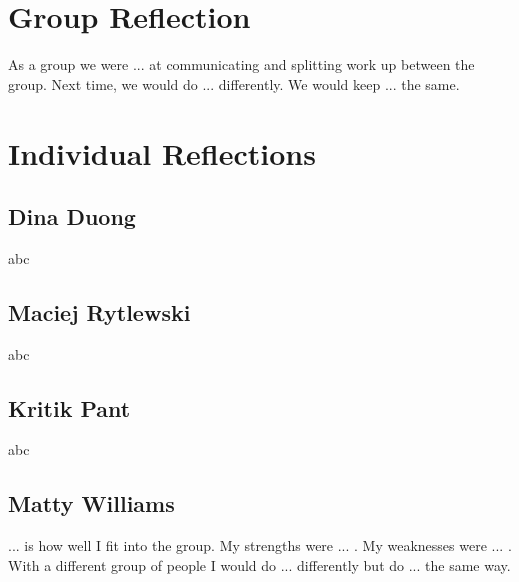 \documentclass[11pt]{article}
\begin{document}
\section{Group Reflection}

As a group we were ... at communicating and splitting work up between the group.
Next time, we would do ... differently. We would keep ... the same.

\section{Individual Reflections}

\subsection{Dina Duong}

abc

\subsection{Maciej Rytlewski}

abc

\subsection{Kritik Pant}

abc

\subsection{Matty Williams}

... is how well I fit into the group.
My strengths were ... .
My weaknesses were ... .
With a different group of people I would do ... differently but do ... the same way. 
\end{document}
